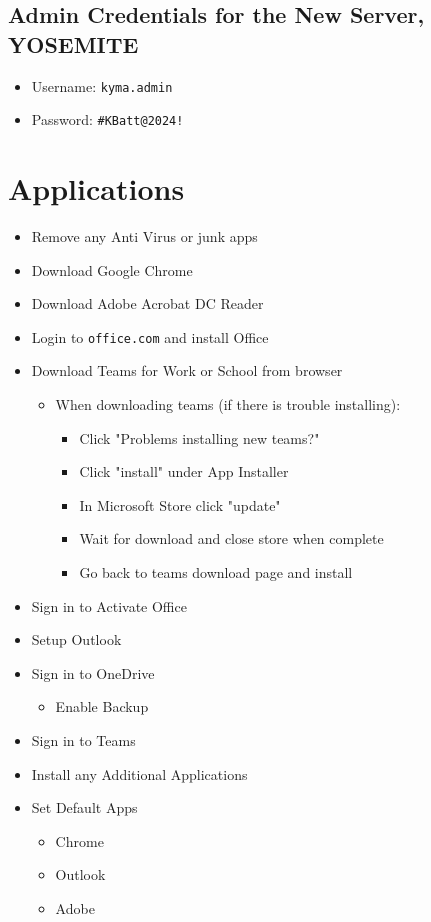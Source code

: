 \documentclass{article}
\begin{document}
\subsection*{Admin Credentials for the New Server, YOSEMITE}
\begin{itemize}
    \item Username: \texttt{kyma.admin}
    \item Password: \texttt{\#KBatt@2024!}
\end{itemize}

\section*{Applications}
\begin{itemize}
    \item Remove any Anti Virus or junk apps
    \item Download Google Chrome
    \item Download Adobe Acrobat DC Reader
    \item Login to \texttt{office.com} and install Office
    \item Download Teams for Work or School from browser
    \begin{itemize}
        \item When downloading teams (if there is trouble installing):
        \begin{itemize}
            \item Click "Problems installing new teams?"
            \item Click "install" under App Installer
            \item In Microsoft Store click "update"
            \item Wait for download and close store when complete
            \item Go back to teams download page and install
        \end{itemize}
    \end{itemize}
    \item Sign in to Activate Office
    \item Setup Outlook
    \item Sign in to OneDrive
    \begin{itemize}
        \item Enable Backup
    \end{itemize}
    \item Sign in to Teams
    \item Install any Additional Applications
    \item Set Default Apps
    \begin{itemize}
        \item Chrome
        \item Outlook
        \item Adobe
    \end{itemize}
\end{itemize}
\end{document}
